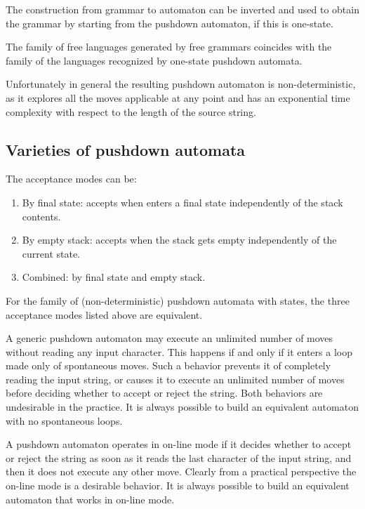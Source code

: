 The construction from grammar to automaton can be inverted and used to obtain the grammar by starting from the pushdown automaton, if this is one-state.
\begin{property}
    The family of free languages generated by free grammars coincides with the family of the languages recognized by one-state pushdown automata.
\end{property}
Unfortunately in general the resulting pushdown automaton is non-deterministic, as it explores all the moves applicable at any point and has an exponential time complexity with respect to the length of the source string.

\subsection*{Varieties of pushdown automata}
The acceptance modes can be: 
\begin{enumerate}
    \item By final state: accepts when enters a final state independently of the stack contents. 
    \item By empty stack: accepts when the stack gets empty independently of the current state. 
    \item Combined: by final state and empty stack.
\end{enumerate}
\begin{property}
    For the family of (non-deterministic) pushdown automata with states, the three acceptance modes listed above are equivalent. 
\end{property}
A generic pushdown automaton may execute an unlimited number of moves without reading any input character. 
This happens if and only if it enters a loop made only of spontaneous moves. 
Such a behavior prevents it of completely reading the input string, or causes it to execute an unlimited number of moves before deciding whether to accept or reject the string.
Both behaviors are undesirable in the practice. 
It is always possible to build an equivalent automaton with no spontaneous loops. 

A pushdown automaton operates in on-line mode if it decides whether to accept or reject the string as soon as it reads the last character of the input string, and then it does not execute any other move. 
Clearly from a practical perspective the on-line mode is a desirable behavior.
It is always possible to build an equivalent automaton that works in on-line mode. 


